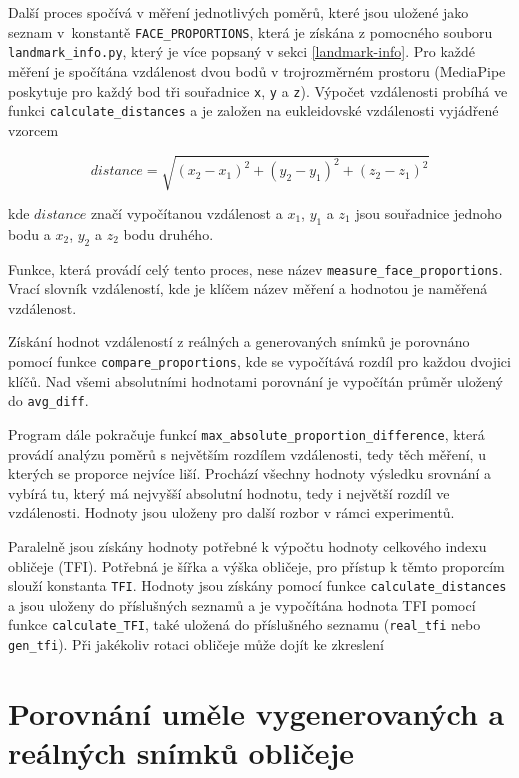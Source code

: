Další proces spočívá v měření jednotlivých poměrů, které jsou uložené jako seznam v~konstantě \texttt{FACE\_PROPORTIONS}, která je získána z pomocného souboru \texttt{landmark\_info.py}, který je více popsaný v sekci \ref{landmark-info}. Pro každé měření je spočítána vzdálenost dvou bodů v trojrozměrném prostoru (MediaPipe poskytuje pro každý bod tři souřadnice \texttt{x}, \texttt{y} a \texttt{z}). Výpočet vzdálenosti probíhá ve funkci \texttt{calculate\_distances} a je založen na eukleidovské vzdálenosti vyjádřené vzorcem

\begin{equation}
    distance = \sqrt{(x_2 - x_1)^2 + (y_2 - y_1)^2 + (z_2 - z_1)^2}
\end{equation}

kde $distance$ značí vypočítanou vzdálenost a $x_1$, $y_1$ a $z_1$ jsou souřadnice jednoho bodu a $x_2$, $y_2$ a $z_2$ bodu druhého.

Funkce, která provádí celý tento proces, nese název \texttt{measure\_face\_proportions}. Vrací slovník vzdáleností, kde je klíčem název měření a hodnotou je naměřená vzdálenost.

\bigskip

\noindent Získání hodnot vzdáleností z reálných a generovaných snímků je porovnáno pomocí funkce \texttt{compare\_proportions}, kde se vypočítává rozdíl pro každou dvojici klíčů. Nad všemi absolutními hodnotami porovnání je vypočítán průměr uložený do \texttt{avg\_diff}.

Program dále pokračuje funkcí \texttt{max\_absolute\_proportion\_difference}, která provádí analýzu poměrů s největším rozdílem vzdálenosti, tedy těch měření, u kterých se proporce nejvíce liší. Prochází všechny hodnoty výsledku srovnání a vybírá tu, který má nejvyšší absolutní hodnotu, tedy i největší rozdíl ve vzdálenosti. Hodnoty jsou uloženy pro další rozbor v rámci experimentů.

\bigskip

\noindent Paralelně jsou získány hodnoty potřebné k výpočtu hodnoty celkového indexu obličeje (TFI). Potřebná je šířka a výška obličeje, pro přístup k těmto proporcím slouží konstanta \texttt{TFI}. Hodnoty jsou získány pomocí funkce \texttt{calculate\_distances} a jsou uloženy do příslušných seznamů a je vypočítána hodnota TFI pomocí funkce \texttt{calculate\_TFI}, také uložená do příslušného seznamu (\texttt{real\_tfi} nebo \texttt{gen\_tfi}). Při jakékoliv rotaci obličeje může dojít ke zkreslení

\section{Porovnání uměle vygenerovaných a reálných snímků obličeje}
\label{Deepface-implementation}

